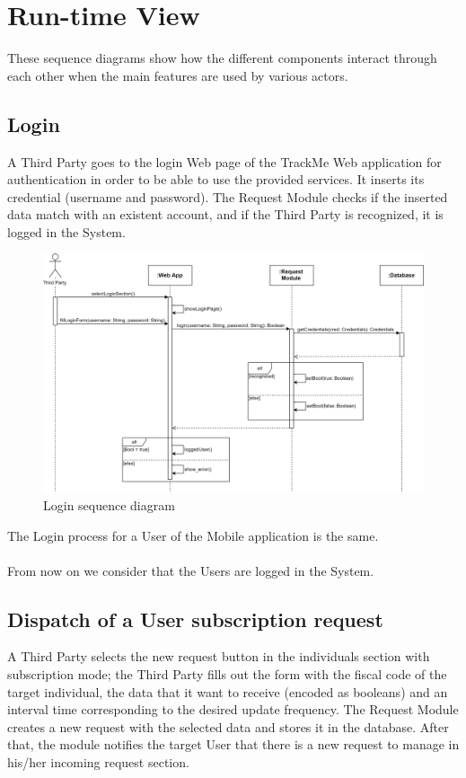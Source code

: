 \section{Run-time View}
These sequence diagrams show how the different components interact through each other when the main features are used by various actors.

\subsection{Login}
A Third Party goes to the login Web page of the TrackMe Web application for authentication in order to be able to use the provided services. It inserts its credential (username and password). The Request Module checks if the inserted data match with an existent account, and if the Third Party is recognized, it is logged in the System.

\begin{figure}[H]

    \centering
    \includegraphics[scale=0.15]{./Pictures/login.png}
    \caption{Login sequence diagram}
    
\end{figure}

The Login process for a User of the Mobile application is the same.\\ \\
From now on we consider that the Users are logged in the System.

\subsection{Dispatch of a User subscription request}
A Third Party selects the new request button in the individuals section with subscription mode; the Third Party fills out the form with the fiscal code of the target individual, the data that it want to receive (encoded as booleans) and an interval time corresponding to the desired update frequency. The Request Module creates a new request with the selected data and stores it in the database. After that, the module notifies the target User that there is a new request to manage in his/her incoming request section.

